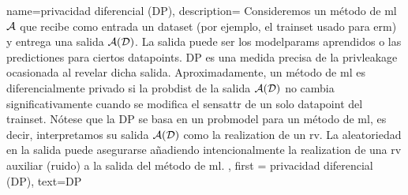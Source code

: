 	 {name=privacidad diferencial (DP),
	  description={
		  Consideremos un método de \gls{ml} $\mathcal{A}$ que recibe como entrada un \gls{dataset} (por ejemplo, el \gls{trainset} 
		  usado para \gls{erm}) y entrega una salida $\mathcal{A}(\mathcal{D})$. La salida 
		  puede ser los \gls{modelparams} aprendidos o las \gls{prediction}es para ciertos \gls{datapoint}s. 
		  DP es una medida precisa de la \gls{privleakage} ocasionada al revelar dicha salida.
		 Aproximadamente, un método de \gls{ml} es diferencialmente privado si la \gls{probdist} 
		  de la salida $\mathcal{A}(\mathcal{D})$ no cambia significativamente cuando se modifica el \gls{sensattr} 
		  de un solo \gls{datapoint} del \gls{trainset}. Nótese que la DP 
		  se basa en un \gls{probmodel} para un método de \gls{ml}, es decir, interpretamos su salida $\mathcal{A}(\mathcal{D})$ 
		  como la \gls{realization} de un \gls{rv}. La aleatoriedad en la salida puede asegurarse añadiendo intencionalmente la
		  \gls{realization} de una \gls{rv} auxiliar (ruido) a la salida del método de  \gls{ml}.
		 }, 
		 first = {privacidad diferencial (DP)}, text={DP} 
	 }
